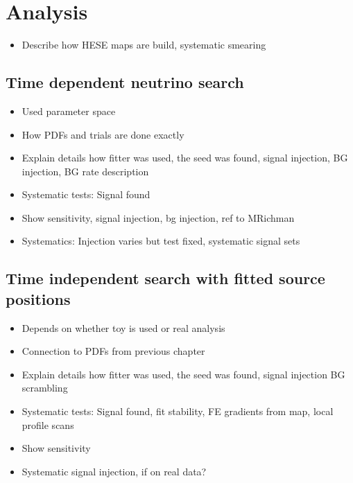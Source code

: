 \chapter{Analysis}

\begin{itemize}
  \item Describe how HESE maps are build, systematic smearing
\end{itemize}

\section{Time dependent neutrino search}
\begin{itemize}
  \item Used parameter space
  \item How PDFs and trials are done exactly
  \item Explain details how fitter was used, the seed was found, signal injection, BG injection, BG rate description
  \item Systematic tests: Signal found
  \item Show sensitivity, signal injection, bg injection, ref to MRichman
  \item Systematics: Injection varies but test fixed, systematic signal sets
\end{itemize}

\section{Time independent search with fitted source positions}
\begin{itemize}
  \item Depends on whether toy is used or real analysis
  \item Connection to PDFs from previous chapter
  \item Explain details how fitter was used, the seed was found, signal injection BG scrambling
  \item Systematic tests: Signal found, fit stability, FE gradients from map, local profile scans
  \item Show sensitivity
  \item Systematic signal injection, if on real data?
\end{itemize}
